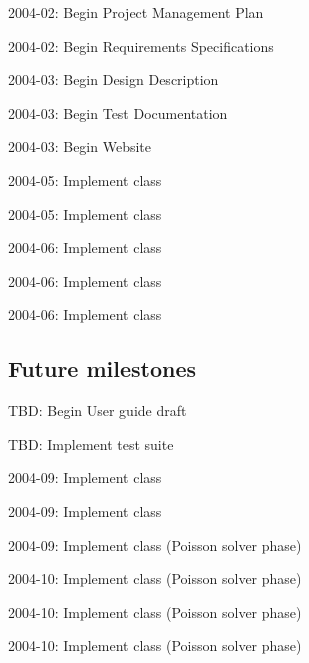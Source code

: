 \documentclass[11pt]{article}
\begin{document}
\BeginDESCRIPTION
\item[2004-02: ] Begin Project Management Plan
\item[2004-02: ] Begin Requirements Specifications
\item[2004-03: ] Begin Design Description
\item[2004-03: ] Begin Test Documentation
\item[2004-03: ]  Begin Website
\item[2004-05: ] Implement  class
\item[2004-05: ] Implement  class
\item[2004-06: ] Implement  class
\item[2004-06: ] Implement  class
\item[2004-06: ] Implement  class
\EndDESCRIPTION

\subsection{Future milestones}

\BeginDESCRIPTION
\item[TBD: ]  Begin User guide draft
\item[TBD: ]  Implement test suite
\item[2004-09: ] Implement  class
\item[2004-09: ] Implement  class
\item[2004-09: ] Implement  class (Poisson solver phase)
\item[2004-10: ] Implement  class (Poisson solver phase)
\item[2004-10: ] Implement  class (Poisson solver phase)
\item[2004-10: ] Implement  class (Poisson solver phase)
\end{document}
